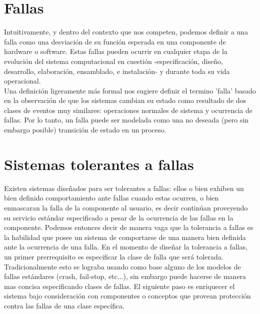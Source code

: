 \documentclass[titlepage, 12pt]{book}
\begin{document}
\section{Fallas}
Intuitivamente, y dentro del contexto que nos competen, podemos definir a una falla como una desviaci\'on de su funci\'on esperada en una componente de hardware o software. Estas fallas pueden ocurrir en cualquier etapa de la evoluci\'on del sistema computacional en cuesti\'on -especificaci\'on, dise\~no, desarrollo, elaboraci\'on, ensamblado, e instalaci\'on- y durante toda su vida operacional\cite{FaultInject}.\\

Una definici\'on ligeramente m\'as formal nos sugiere definir el termino 'falla' basado en la observaci\'on de que los sistemas cambian su estado como resultado de dos clases de eventos muy similares: operaciones normales de sistema y ocurrencia de fallas. Por lo tanto, un falla puede ser modelada como una no deseada (pero sin embargo posible) transici\'on de estado en un proceso\cite{Felix}.






\section{Sistemas tolerantes a fallas}
Existen sistemas dise\~nados para ser tolerantes a fallas: ellos o bien exhiben un bien definido comportamiento ante fallas cuando estas ocurren, o bien enmascaran la falla de la componente al usuario, es decir contin\'uan proveyendo su servicio est\'andar especificado a pesar de la ocurrencia de las fallas en la componente\cite{Cristian}.
Podemos entonces decir de manera vaga que la tolerancia a fallas es la habilidad que posee un sistema de comportarse de una manera bien definida ante la ocurrencia de una falla. En el momento de dise\~nar la tolerancia a fallas, un primer prerrequisito es especificar la clase de falla que ser\'a tolerada. Tradicionalmente esto se lograba usando como base alguno de los modelos de fallas est\'andares (crash, fail-stop, etc...), sin embargo puede hacerse de manera mas concisa especificando clases de fallas. El siguiente paso es enriquecer el sistema bajo consideraci\'on con componentes o conceptos que provean protecci\'on contra las fallas de una clase espec\'ifica\cite{FaultInject}.\\
\end{document}
